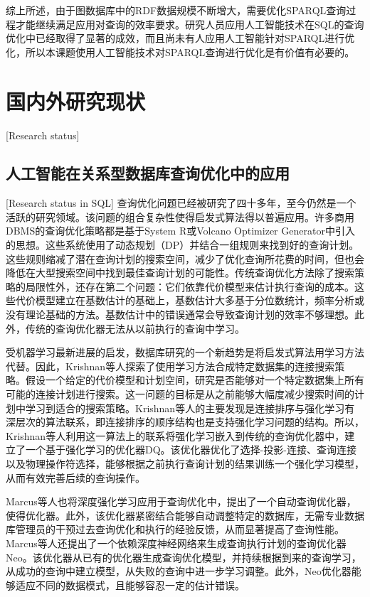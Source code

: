 综上所述，由于图数据库中的RDF数据规模不断增大，需要优化SPARQL查询过程才能继续满足应用对查询的效率要求。研究人员应用人工智能技术在SQL的查询优化中已经取得了显著的成效，而且尚未有人应用人工智能针对SPARQL进行优化，所以本课题使用人工智能技术对SPARQL查询进行优化是有价值有必要的。


\section{国内外研究现状}[Research status]

\subsection{人工智能在关系型数据库查询优化中的应用}[Research status in SQL]
查询优化问题已经被研究了四十多年，至今仍然是一个活跃的研究领域。该问题的组合复杂性使得启发式算法得以普遍应用\cite{DRL}。许多商用DBMS的查询优化策略都是基于System R\cite{SystemR}或Volcano Optimizer Generator\cite{Volcano}中引入的思想。这些系统使用了动态规划（DP）并结合一组规则来找到好的查询计划。这些规则缩减了潜在查询计划的搜索空间，减少了优化查询所花费的时间，但也会降低在大型搜索空间中找到最佳查询计划的可能性。传统查询优化方法除了搜索策略的局限性外，还存在第二个问题：它们依靠代价模型来估计执行查询的成本。这些代价模型建立在基数估计的基础上，基数估计大多基于分位数统计，频率分析或没有理论基础的方法。基数估计中的错误通常会导致查询计划的效率不够理想。此外，传统的查询优化器无法从以前执行的查询中学习。

受机器学习最新进展的启发，数据库研究的一个新趋势是将启发式算法用学习方法代替。因此，Krishnan等人探索了使用学习方法合成特定数据集的连接搜索策略\cite{DRLJoin}。假设一个给定的代价模型和计划空间，研究是否能够对一个特定数据集上所有可能的连接计划进行搜索。这一问题的目标是从之前能够大幅度减少搜索时间的计划中学习到适合的搜索策略。Krishnan等人的主要发现是连接排序与强化学习有深层次的算法联系，即连接排序的顺序结构也是支持强化学习问题的结构。所以，Krishnan等人利用这一算法上的联系将强化学习嵌入到传统的查询优化器中，建立了一个基于强化学习的优化器DQ。该优化器优化了选择-投影-连接、查询连接以及物理操作符选择，能够根据之前执行查询计划的结果训练一个强化学习模型，从而有效完善后续的查询操作。

Marcus等人也将深度强化学习应用于查询优化中，提出了一个自动查询优化器，使得优化器。此外，该优化器紧密结合能够自动调整特定的数据库，无需专业数据库管理员的干预\cite{Hands-Free}过去查询优化和执行的经验反馈，从而显著提高了查询性能。Marcus等人还提出了一个依赖深度神经网络来生成查询执行计划的查询优化器Neo\cite{Neo}。该优化器从已有的优化器生成查询优化模型，并持续根据到来的查询学习，从成功的查询中建立模型，从失败的查询中进一步学习调整。此外，Neo优化器能够适应不同的数据模式，且能够容忍一定的估计错误。

